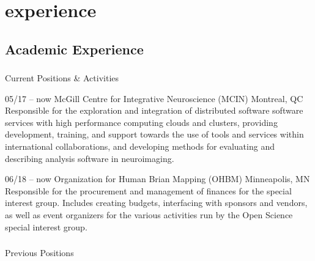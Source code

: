 \documentclass[]{friggeri-cv} %
\begin{document}
\section{experience}

\subsection{Academic Experience}

\subsubsection{}{Current Positions \& Activities}

\begin{entrylist}
\entry
{05/17 -- now}
{McGill Centre for Integrative Neuroscience (MCIN)}
{Montreal, QC}
{ \\
Responsible for the exploration and integration of distributed software software services with high
performance computing clouds and clusters, providing development, training, and support towards the
use of tools and services within international collaborations, and developing methods for evaluating
and describing analysis software in neuroimaging.}


\entry
{06/18 -- now}
{Organization for Human Brian Mapping (OHBM)}
{Minneapolis, MN}
{ \\
Responsible for the procurement and management of finances for the special interest group. Includes
creating budgets, interfacing with sponsors and vendors, as well as event organizers for the various
activities run by the Open Science special interest group.}
\end{entrylist}


\clearpage
\subsubsection{}{Previous Positions}
\end{document}
